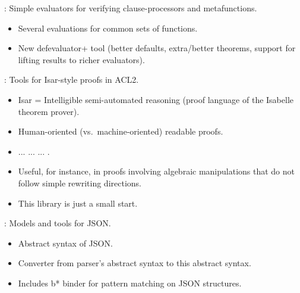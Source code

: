 
\begin{frame}

\newlibtitle

:
Simple evaluators for verifying clause-processors and metafunctions.
\begin{itemize}
\item Several evaluations for common sets of functions.
\item New defevaluator+ tool (better defaults, extra/better theorems,
      support for lifting results to richer evaluators).
\end{itemize}

\end{frame}


\begin{frame}

\newlibtitle

:
Tools for Isar-style proofs in ACL2.
\begin{itemize}
\item Isar = Intelligible semi-automated reasoning
      (proof language of the Isabelle theorem prover).
\item Human-oriented (vs.\ machine-oriented) readable proofs.
\item {} ...  ...  ... .
\item Useful, for instance, in proofs involving algebraic manipulations
      that do not follow simple rewriting directions.
\item This library is just a small start.
\end{itemize}

\end{frame}


\begin{frame}

\newlibtitle

:
Models and tools for JSON.
\begin{itemize}
\item Abstract syntax of JSON.
\item Converter from parser's abstract syntax to this abstract syntax.
\item Includes b* binder for pattern matching on JSON structures.
\end{itemize}

\end{frame}

